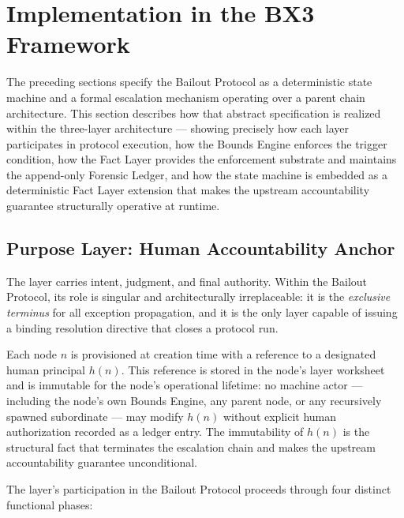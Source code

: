 \section{Implementation in the BX3 Framework}\label{sec:implementation}

The preceding sections specify the Bailout Protocol as a deterministic state machine and a formal escalation mechanism operating over a parent chain architecture. This section describes how that abstract specification is realized within the \bxthree{} three-layer architecture — showing precisely how each layer participates in protocol execution, how the Bounds Engine enforces the trigger condition, how the Fact Layer provides the enforcement substrate and maintains the append-only Forensic Ledger, and how the state machine is embedded as a deterministic Fact Layer extension that makes the upstream accountability guarantee structurally operative at runtime.

\subsection{Purpose Layer: Human Accountability Anchor}\label{sec:purpose-layer}

The \purpose{} layer carries intent, judgment, and final authority. Within the Bailout Protocol, its role is singular and architecturally irreplaceable: it is the \emph{exclusive terminus} for all exception propagation, and it is the only layer capable of issuing a binding resolution directive that closes a protocol run.

Each \bxthree{} node $n$ is provisioned at creation time with a reference to a designated human principal $h(n)$. This reference is stored in the node's \purpose{} layer worksheet and is immutable for the node's operational lifetime: no machine actor — including the node's own Bounds Engine, any parent node, or any recursively spawned subordinate — may modify $h(n)$ without explicit human authorization recorded as a ledger entry. The immutability of $h(n)$ is the structural fact that terminates the escalation chain and makes the upstream accountability guarantee unconditional.

The \purpose{} layer's participation in the Bailout Protocol proceeds through four distinct functional phases:

